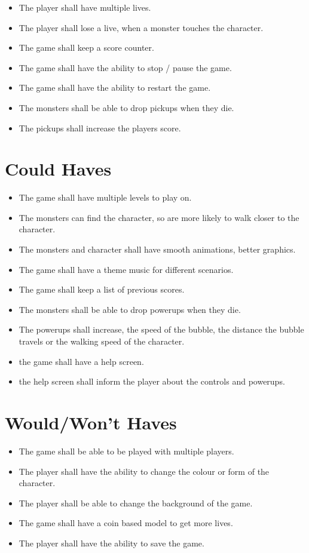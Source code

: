\begin{itemize}
\itemsep0em 
 \item The player shall have multiple lives.
 \item The player shall lose a live, when a monster touches the character. 
 \item The game shall keep a score counter.
 \item The game shall have the ability to stop / pause the game. 
 \item The game shall have the ability to restart the game.
 \item The monsters shall be able to drop pickups when they die.
 \item The pickups shall increase the players score.
\end{itemize}

\section{Could Haves}

\begin{itemize}
\itemsep0em 
  \item The game shall have multiple levels to play on.
  \item The monsters can find the character, so are more likely to walk closer to the character.
  \item The monsters and character shall have smooth animations, better graphics.
  \item The game shall have a theme music for different scenarios.
  \item The game shall keep a list of previous scores.
  \item The monsters shall be able to drop powerups when they die.
  \item The powerups shall increase, the speed of the bubble, the distance the bubble travels or the walking speed of the character.
  \item the game shall have a help screen.
  \item the help screen shall inform the player about the controls and powerups.
\end{itemize}

\section{Would/Won't Haves}
\begin{itemize}
\itemsep0em 
	\item The game shall be able to be played with multiple players.
	\item The player shall have the ability to change the colour or form of the character.
	\item The player shall be able to change the background of the game.
	\item The game shall have a coin based model to get more lives.
	\item The player shall have the ability to save the game.
\end{itemize}